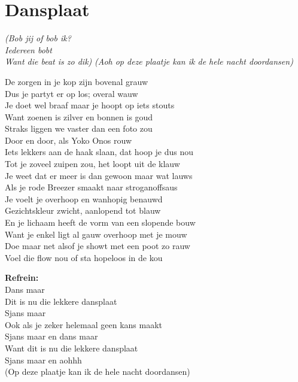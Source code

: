 \section{Dansplaat} 
\textit{(Bob jij of bob ik?\\
Iedereen bobt\\
Want die beat is zo dik)
}
\textit{(Aoh op deze plaatje kan ik de hele nacht doordansen)}

De zorgen in je kop zijn bovenal grauw\\
Dus je partyt er op los; overal wauw\\
Je doet wel braaf maar je hoopt op iets stouts\\
Want zoenen is zilver en bonnen is goud\\
Straks liggen we vaster dan een foto zou\\
Door en door, als Yoko Onos rouw\\
Iets lekkers aan de haak slaan, dat hoop je dus nou\\
Tot je zoveel zuipen zou, het loopt uit de klauw\\
Je weet dat er meer is dan gewoon maar wat lauws\\
Als je rode Breezer smaakt naar stroganoffsaus\\
Je voelt je overhoop en wanhopig benauwd\\
Gezichtskleur zwicht, aanlopend tot blauw\\
En je lichaam heeft de vorm van een slopende bouw\\
Want je enkel ligt al gauw overhoop met je mouw\\
Doe maar net alsof je showt met een poot zo rauw\\
Voel die flow nou of sta hopeloos in de kou

\textbf{Refrein:}\\
Dans maar\\
Dit is nu die lekkere dansplaat\\
Sjans maar\\
Ook als je zeker helemaal geen kans maakt\\
Sjans maar en dans maar\\
Want dit is nu die lekkere dansplaat\\
Sjans maar en aohhh\\
(Op deze plaatje kan ik de hele nacht doordansen)

